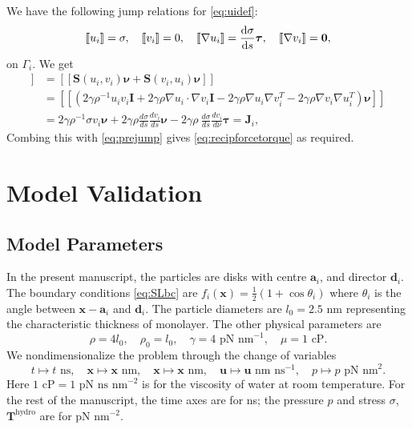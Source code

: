 \documentclass[lineno]{jfm}
\renewcommand{\aa}{\mathbf{a}}
\newcommand{\dd}{\mathbf{d}}
\newcommand{\JJ}{\mathbf{J}}
\newcommand{\nnu}{\boldsymbol{\nu}}
\newcommand{\ttau}{\boldsymbol{\tau}}
\newcommand{\xx}{\mathbf{x}}
\newcommand{\uu}{\mathbf{u}}
\newcommand{\jump}[1]{[\![ #1 ]\!]}
\begin{document}
We have the following jump relations for \eqref{eq:uidef}: 
\begin{equation}
\label{eq:DLjump}
\jump{u_i} = \sigma, \quad
\jump{v_i} = 0, \quad
\jump{\nabla u_i} = \frac{\dif \sigma}{\dif s}\ttau,\quad
\jump{\nabla v_i} = \mathbf{0},
\end{equation}
on $\Gamma_i$. We get 
\begin{align*}
  \jump{{\bf T}_2\nnu}   &= \jump{\mathbf{S}(u_i,v_i)\nnu  +\mathbf{S}(v_i,u_i)\nnu} \\
  &= \jump{( 2\gamma\rho^{-1} u_i v_i \mathbf{I} + 2\gamma\rho \nabla u_i \cdot \nabla v_i \mathbf{I} 
- 2\gamma\rho \nabla u_i  \nabla v_i^T - 2\gamma\rho \nabla v_i \nabla u_i^T)  \nnu}\\
&= 2\gamma\rho^{-1} \sigma v_i \nnu + 2\gamma\rho \frac{d\sigma }{ds}\frac{dv_i }{ds} \nnu
- 2\gamma\rho \ \frac{d\sigma }{ds} \frac{dv_i }{d\nu} \ttau = \JJ_i,
\end{align*}
Combing  this with \eqref{eq:prejump}  gives  \eqref{eq:recipforcetorque}
as required. 





\section{\label{validation}Model Validation}


\subsection{Model Parameters}
In the present manuscript, the particles are disks with centre $\aa_i$, and director $\dd_i$.  
The boundary conditions \eqref{eq:SLbc} are $f_i(\xx) = \tfrac{1}{2}(1 + \cos \theta_i)$ where $\theta_i$ is the angle between 
$\xx - \aa_i$ and $\dd_i$.  The particle diameters are $l_0 = 2.5$ nm representing the characteristic thickness of monolayer. 
The other physical parameters are 
\begin{equation}
\label{eq:parameters}
\rho = 4 l_0,\quad \rho_0 = l_0,\quad \gamma = \text{4 pN nm}^{-1},\quad \mu = \text{1 cP}.
\end{equation}
We nondimensionalize the problem through the change of variables 
\begin{equation}
\label{eq:nondimensionalize}
t \mapsto t \text{ ns}, \quad
\xx \mapsto \xx \text{ nm}, \quad 
\xx \mapsto \xx \text{ nm}, \quad 
\uu \mapsto \uu \text{ nm ns}^{-1}, \quad 
  p \mapsto p \text{ pN nm}^2.
\end{equation}
Here $\text{1 cP} = \text{1 pN ns nm}^{-2}$ is for the viscosity of water at room temperature.  
For the rest of the manuscript, the time axes are for ns; the pressure $p$ and stress $\sigma$, $\mathbf{T}^{\mathrm{hydro}}$
are for pN nm$^{-2}$.
\end{document}
